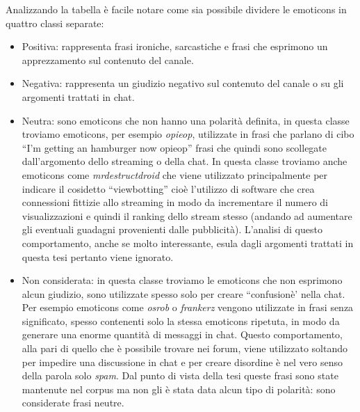 \documentclass[a4paper,12pt,openright,twoside]{report}
\theoremstyle{definition}
\begin{document}
Analizzando la tabella è facile notare come sia possibile dividere le emoticons in quattro classi separate:
\begin{itemize}
\item Positiva: rappresenta frasi ironiche, sarcastiche e frasi che esprimono un apprezzamento sul contenuto del canale.
\item Negativa: rappresenta un giudizio negativo sul contenuto del canale o su gli argomenti trattati in chat.
\item Neutra: sono emoticons che non hanno una polarità definita, in questa classe troviamo emoticons, per esempio \emph{opieop}, utilizzate in frasi che parlano di 
cibo ``I'm getting an hamburger now opieop'' frasi che quindi sono scollegate dall'argomento dello streaming o della chat. 
In questa classe troviamo anche emoticons come \emph{mrdestructdroid} che viene utilizzato principalmente per indicare il cosidetto ``viewbotting'' 
cioè l'utilizzo di software che crea connessioni fittizie allo streaming in modo da incrementare il numero di visualizzazioni 
e quindi il ranking dello stream stesso (andando ad aumentare gli eventuali guadagni provenienti dalle pubblicità). 
L'analisi di questo comportamento, anche se molto interessante, esula dagli argomenti trattati in questa tesi pertanto viene ignorato.
\item Non considerata: in questa classe troviamo le emoticons che non esprimono alcun giudizio, sono utilizzate spesso solo per creare ``confusionè' nella chat.
Per esempio emoticons come \emph{osrob} o \emph{frankerz} vengono utilizzate in frasi senza significato, spesso contenenti solo la stessa emoticons ripetuta,
in modo da generare una enorme quantità di messaggi in chat. Questo comportamento, alla pari di quello che è possibile trovare nei forum, viene utilizzato 
soltando per impedire una discussione in chat e per creare disordine è nel vero senso della parola solo \emph{spam}. Dal punto di vista della tesi
queste frasi sono state mantenute nel corpus ma non gli è stata data alcun tipo di polarità: sono considerate frasi neutre.
\end{itemize}
\end{document}
